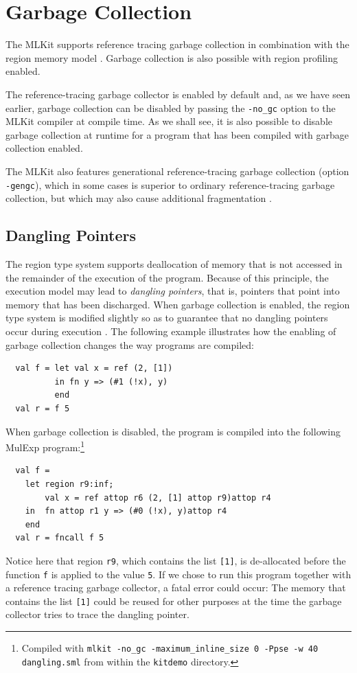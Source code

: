 \documentclass[12pt]{book}
\begin{document}
\chapter{Garbage Collection}
\label{gc.chap}
The MLKit supports reference tracing garbage collection in
combination with the region memory model \cite{hallenberg99,het02}.
Garbage collection is also possible with region profiling enabled.

The reference-tracing garbage collector is enabled by default and, as
we have seen earlier, garbage collection can be disabled by passing
the \texttt{-no\_gc} option to the MLKit compiler at compile time. As
we shall see, it is also possible to disable garbage collection at
runtime for a program that has been compiled with garbage collection
enabled.

The MLKit also features generational reference-tracing garbage
collection (option \texttt{-gengc}), which in some cases is superior
to ordinary reference-tracing garbage collection, but which may also
cause additional fragmentation \cite{elshaljfp21}.

\section{Dangling Pointers}
The region type system supports deallocation of memory that is not
accessed in the remainder of the execution of the program. Because of
this principle, the execution model may lead to {\em dangling
  pointers}, that is, pointers that point into memory that has been
discharged. When garbage collection is enabled, the region type system
is modified slightly so as to guarantee that no dangling pointers
occur during execution \cite{elsman:tldi03}. The following example
illustrates how the enabling of garbage collection changes the way
programs are compiled:
\begin{verbatim}
  val f = let val x = ref (2, [1])
          in fn y => (#1 (!x), y)
          end
  val r = f 5
\end{verbatim}
When garbage collection is disabled, the program is compiled into the
following MulExp program:\footnote{Compiled with {\tt mlkit -no\_gc
    -maximum\_inline\_size 0 -Ppse -w 40 dangling.sml} from within the
  {\tt kitdemo} directory.}
\begin{verbatim}
  val f =
    let region r9:inf;
        val x = ref attop r6 (2, [1] attop r9)attop r4
    in  fn attop r1 y => (#0 (!x), y)attop r4
    end
  val r = fncall f 5
\end{verbatim}
Notice here that region {\tt r9}, which contains the list {\tt [1]},
is de-allocated before the function {\tt f} is applied to the value
{\tt 5}. If we chose to run this program together with a reference
tracing garbage collector, a fatal error could occur: The memory that
contains the list {\tt [1]} could be reused for other purposes at the
time the garbage collector tries to trace the dangling pointer.
\end{document}
